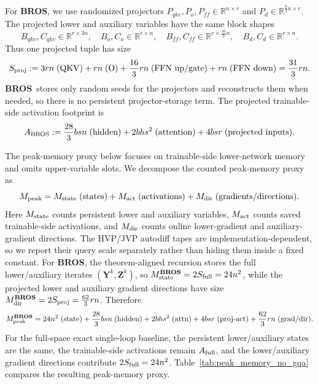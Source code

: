 \documentclass{pkumelon}
\theoremstyle{plain}
\newcommand{\oursname}{\textnormal{\textbf{BROS}}}
\newcommand{\ours}{\oursname\ }
\newcommand{\ourslast}{\oursname}
\begin{document}
For \ourslast, we use randomized projectors $P_{qkv},P_o,P_{ff}\in\mathbb R^{n\times r}$ and $P_d\in\mathbb R^{\frac{8}{3}n\times r}$. The projected lower and auxiliary variables have the same block shapes
\begin{equation*}
B_{qkv},C_{qkv}\in\mathbb R^{r\times3n},\quad B_o,C_o\in\mathbb R^{r\times n},\quad B_{ff},C_{ff}\in\mathbb R^{r\times\frac{16}{3}n},\quad B_d,C_d\in\mathbb R^{r\times n}.
\end{equation*}
Thus one projected tuple has size
\begin{equation*}
S_{\rm proj}:=3rn\;(\text{QKV})+rn\;(\text{O})+\frac{16}{3}rn\;(\text{FFN up/gate})+rn\;(\text{FFN down})=\frac{31}{3}rn.
\end{equation*}
\ours stores only random seeds for the projectors and reconstructs them when needed, so there is no persistent projector-storage term. The projected trainable-side activation footprint is
\begin{equation*}
A_{\rm BROS}:=\frac{28}{3}bsn\;(\text{hidden})+2bhs^2\;(\text{attention})+4bsr\;(\text{projected inputs}).
\end{equation*}

The peak-memory proxy below focuses on trainable-side lower-network memory and omits upper-variable slots. We decompose the counted peak-memory proxy as
\begin{equation*}
M_{\rm peak}=M_{\rm state}\;(\text{states})+M_{\rm act}\;(\text{activations})+M_{\rm dir}\;(\text{gradients/directions}).
\end{equation*}
Here $M_{\rm state}$ counts persistent lower and auxiliary variables, $M_{\rm act}$ counts saved trainable-side activations, and $M_{\rm dir}$ counts online lower-gradient and auxiliary-gradient directions. The HVP/JVP autodiff tapes are implementation-dependent, so we report their query scale separately rather than hiding them inside a fixed constant. For \ourslast, the theorem-aligned recursion stores the full lower/auxiliary iterates $(\boldsymbol Y^k,\boldsymbol Z^k)$, so $M_{\rm state}^{\text{\ourslast}}=2S_{\rm full}=24n^2$, while the projected lower and auxiliary gradient directions have size $M_{\rm dir}^{\text{\ourslast}}=2S_{\rm proj}=\frac{62}{3}rn$. Therefore
\begin{equation}
\label{eq:peak_mabros_sgd_final}
M_{\rm peak}^{\text{\ourslast}}=24n^2\;(\text{state})+\frac{28}{3}bsn\;(\text{hidden})+2bhs^2\;(\text{attn})+4bsr\;(\text{proj-act})+\frac{62}{3}rn\;(\text{grad/dir}).
\end{equation}
For the full-space exact single-loop baseline, the persistent lower/auxiliary states are the same, the trainable-side activations remain $A_{\rm full}$, and the lower/auxiliary gradient directions contribute $2S_{\rm full}=24n^2$. Table~\ref{tab:peak_memory_no_gqa} compares the resulting peak-memory proxy.
\end{document}
